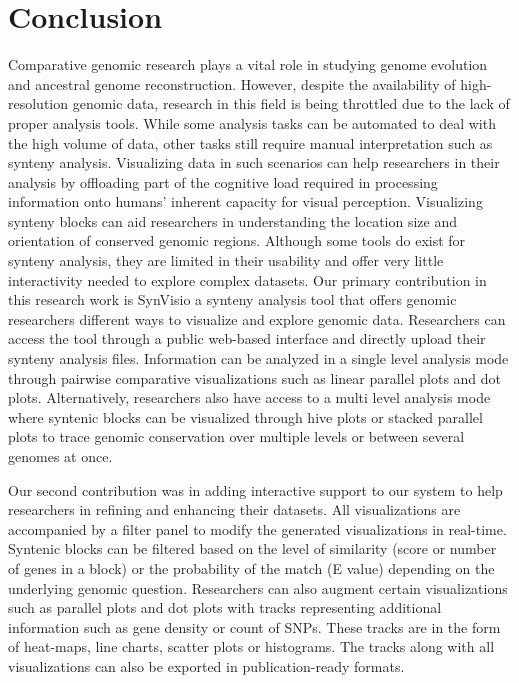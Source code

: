 \chapter{Conclusion}

Comparative genomic research plays a vital role in studying genome evolution and ancestral genome reconstruction. However, despite the availability of high-resolution genomic data, research in this field is being throttled due to the lack of proper analysis tools. While some analysis tasks can be automated to deal with the high volume of data, other tasks still require manual interpretation such as synteny analysis. Visualizing data in such scenarios can help researchers in their analysis by offloading part of the cognitive load required in processing information onto humans' inherent capacity for visual perception. Visualizing synteny blocks can aid researchers in understanding the location size and orientation of conserved genomic regions. Although some tools do exist for synteny analysis, they are limited in their usability and offer very little interactivity needed to explore complex datasets. Our primary contribution in this research work is SynVisio a synteny analysis tool that offers genomic researchers different ways to visualize and explore genomic data. Researchers can access the tool through a public web-based interface and directly upload their synteny analysis files. Information can be analyzed in a single level analysis mode through pairwise comparative visualizations such as linear parallel plots and dot plots. Alternatively, researchers also have access to a multi level analysis mode where syntenic blocks can be visualized through hive plots or stacked parallel plots to trace genomic conservation over multiple levels or between several genomes at once.

Our second contribution was in adding interactive support to our system to help researchers in refining and enhancing their datasets. All visualizations are accompanied by a filter panel to modify the generated visualizations in real-time. Syntenic blocks can be filtered based on the level of similarity (score or number of genes in a block) or the probability of the match (E value) depending on the underlying genomic question. Researchers can also augment certain visualizations such as parallel plots and dot plots with tracks representing additional information such as gene density or count of SNPs. These tracks are in the form of heat-maps, line charts, scatter plots or histograms. The tracks along with all visualizations can also be exported in publication-ready formats.

